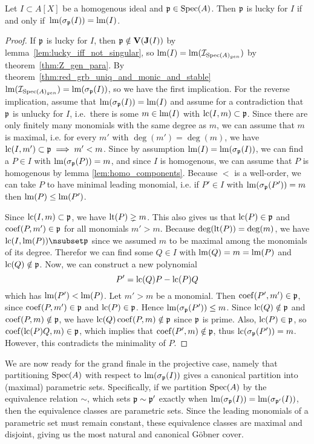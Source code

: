 \begin{theorem}\label{thm:homo_lucky_iff_lm}
  Let $I \subset A[X]$ be a homogenous ideal and $\mathfrak p \in \operatorname{Spec}(A)$. Then $\mathfrak p$ is lucky for $I$ if and only if $\,\operatorname{lm}(\sigma_{\mathfrak p}(I)) = \operatorname{lm}(I)$.
\end{theorem}
\begin{proof}
  If $\mathfrak p$ is lucky for $I$, then $\mathfrak p \notin \operatorname{\mathbf V}(\operatorname{\mathbf J}(I))$ by lemma~\ref{lem:lucky_iff_not_singular}, so $\operatorname{lm}(I) = \operatorname{lm}(\mathcal I_{\operatorname{Spec}(A)_{gen}})$ by theorem~\ref{thm:Z_gen_para}. By theorem~\ref{thm:red_grb_uniq_and_monic_and_stable} $\operatorname{lm}(\mathcal I_{\operatorname{Spec}(A)_{gen}}) = \operatorname{lm}(\sigma_{\mathfrak p}(I))$, so we have the first implication. For the reverse implication, assume that $\operatorname{lm}(\sigma_{\mathfrak p}(I)) = \operatorname{lm}(I)$ and assume for a contradiction that $\mathfrak p$ is unlucky for $I$, i.e.\ there is some $m \in \operatorname{lm}(I)$ with $\operatorname{lc}(I, m) \subset \mathfrak p$. Since there are only finitely many monomials with the same degree as $m$, we can assume that $m$ is maximal, i.e. for every $m'$ with $\deg(m') = \deg(m)$, we have $\operatorname{lc}(I, m') \subset \mathfrak p \implies m' < m$. Since by assumption $\operatorname{lm}(I) = \operatorname{lm}(\sigma_{\mathfrak p}(I))$, we can find a $P \in I$ with $\operatorname{lm}(\sigma_{\mathfrak p}(P)) = m$, and since $I$ is homogenous, we can assume that $P$ is homogenous by lemma \ref{lem:homo_components}. Because $<$ is a well-order, we can take $P$ to have minimal leading monomial, i.e. if $P' \in I$ with $\operatorname{lm}(\sigma_{\mathfrak p}(P')) = m$ then $\operatorname{lm}(P) \leq \operatorname{lm}(P')$.

  Since $\operatorname{lc}(I, m) \subset \mathfrak p$, we have $\operatorname{lt}(P) \gneq m$. This also gives us that $\operatorname{lc}(P) \in \mathfrak p$ and $\operatorname{coef}(P, m') \in \mathfrak p$ for all monomials $m' > m$. Because $\deg(\operatorname{lt}(P)) = \deg(m)$, we have $\LC(I, \LM(P)) \nsubset \p$ since we assumed $m$ to be maximal among the monomials of its degree. Therefor we can find some $Q \in I$ with $\operatorname{lm}(Q) = m = \operatorname{lm}(P)$ and $\operatorname{lc}(Q) \notin \mathfrak p$. Now, we can construct a new polynomial
  \[P' = \operatorname{lc}(Q)P - \operatorname{lc}(P) Q\]
  which has $\operatorname{lm}(P') < \operatorname{lm}(P)$. Let $m' > m$ be a monomial. Then $\operatorname{coef}(P', m') \in \mathfrak p$, since $\operatorname{coef}(P, m') \in \mathfrak p$ and $\operatorname{lc}(P) \in \mathfrak p$. Hence $\operatorname{lm}(\sigma_{\mathfrak p}(P')) \leq m$. Since $\operatorname{lc}(Q) \notin \mathfrak p$ and $\operatorname{coef}(P, m) \notin \mathfrak p$, we have $\operatorname{lc}(Q)\operatorname{coef}(P, m) \notin \mathfrak p$ since $\mathfrak p$ is prime. Also, $\operatorname{lc}(P) \in \mathfrak p$, so $\operatorname{coef}(\operatorname{lc}(P)Q, m) \in \mathfrak p$, which implies that $\operatorname{coef}(P', m) \notin \mathfrak p$, thus $\operatorname{lc}(\sigma_{\mathfrak p}(P')) = m$. However, this contradicts the minimality of $P$.
\end{proof}

We are now ready for the grand finale in the projective case, namely that partitioning $\operatorname{Spec}(A)$ with respect to $\operatorname{lm}(\sigma_{\mathfrak p}(I))$ gives a canonical partition into (maximal) parametric sets. Specifically, if we partition $\operatorname{Spec}(A)$ by the equivalence relation $\sim$, which sets $\mathfrak p \sim \mathfrak p'$ exactly when $\operatorname{lm}(\sigma_{\mathfrak p}(I)) = \operatorname{lm}(\sigma_{\mathfrak p'}(I))$, then the equivalence classes are parametric sets. Since the leading monomials of a parametric set must remain constant, these equivalence classes are maximal and disjoint, giving us the most natural and canonical Göbner cover.

